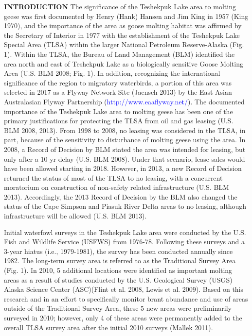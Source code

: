 \documentclass[]{article}
\begin{document}
\textbf{INTRODUCTION}\break
The significance of the Teshekpuk Lake area to molting geese was first
documented by Henry (Hank) Hansen and Jim King in 1957 (King 1970), and
the importance of the area as goose molting habitat was affirmed by the
Secretary of Interior in 1977 with the establishment of the Teshekpuk
Lake Special Area (TLSA) within the larger National Petroleum
Reserve-Alaska (Fig. 1). Within the TLSA, the Bureau of Land Management
(BLM) identified the area north and east of Teshekpuk Lake as a
biologically sensitive Goose Molting Area (U.S. BLM 2008; Fig. 1). In
addition, recognizing the international significance of the region to
migratory waterbirds, a portion of this area was selected in 2017 as a
Flyway Network Site (Jaensch 2013) by the East Asian-Australasian Flyway
Partnership (\textcolor{blue}{http://www.eaaflyway.net/}). The
documented importance of the Teshekpuk Lake area to molting geese has
been one of the primary justifications for protecting the TLSA from oil
and gas leasing (U.S. BLM 2008, 2013). From 1998 to 2008, no leasing was
considered in the TLSA, in part, because of the sensitivity to
disturbance of molting geese using the area. In 2008, a Record of
Decision by BLM stated the area was intended for leasing, but only after
a 10-yr delay (U.S. BLM 2008). Under that scenario, lease sales would
have been allowed starting in 2018. However, in 2013, a new Record of
Decision returned the status of most of the TLSA to no leasing, with a
concurrent moratorium on construction of non-safety related
infrastructure (U.S. BLM 2013). Accordingly, the 2013 Record of Decision
by the BLM also changed the status of the Cape Simpson and Piasuk River
Delta areas to no leasing, although infrastructure will be allowed (U.S.
BLM 2013).

Initial waterfowl surveys in the Teshekpuk Lake area were conducted by
the U.S. Fish and Wildlife Service (USFWS) from 1976-78. Following these
surveys and a 3-year hiatus (i.e., 1979-1981), the survey has been
conducted annually since 1982. The long-term survey area is referred to
as the Traditional Survey Area (Fig. 1). In 2010, 5 additional locations
were identified as important molting areas as a result of studies
conducted by the U.S. Geological Survey (USGS) Alaska Science Center
(ASC)(Flint et al. 2008, Lewis et al. 2009). Based on this research and
in an effort to specifically monitor brant abundance and use of areas
outside of the Traditional Survey Area, these 5 new areas were
preliminarily surveyed in 2010; however, only 4 of these areas were
permanently added to the overall TLSA survey area after the initial 2010
surveys (Mallek 2011).
\end{document}
